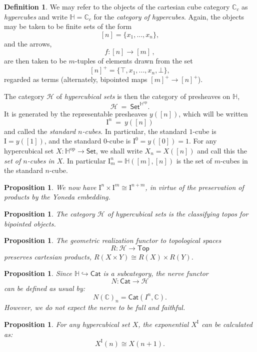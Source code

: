 \documentclass[11pt]{article}
\newcommand{\C}{\ensuremath{\mathbb{C}}}
\newcommand{\psh}[1]{\ensuremath{\mathsf{Set}^{#1^{\mathrm{op}}}}}
\newcommand{\Set}{\ensuremath{\mathsf{Set}}}
\newcommand{\Cat}{\ensuremath{\mathsf{Cat}}}
\newcommand{\hook}{\ensuremath{\hookrightarrow}}
\newcommand{\I}{\ensuremath{\mathrm{I}}}
\renewcommand{\H}{\ensuremath{\mathbb{H}}}
\newcommand{\HH}{\ensuremath{\mathcal{H}}}
\newtheorem{proposition}[theorem]{Proposition}
\theoremstyle{remark}
\theoremstyle{definition}
\newtheorem{definition}[theorem]{Definition}
\begin{document}
\begin{definition}
We may refer to the objects of the cartesian cube category $\C_c $ as \emph{hypercubes} and write $\H = \C_c$ for the \emph{category of hypercubes}.  Again, the objects may be taken to be finite sets of the form $$[n] = \{x_1, ..., x_n\},$$ and the arrows,
\[
f : [n] \to [m]\,,
\]
are then taken to be $m$-tuples of elements drawn from the set $$[n]^+ = \{\top, x_1, ..., x_n, \bot\},$$ regarded as terms (alternately, bipointed maps $[m]^+\to [n]^+$).

The category $\HH$ of \emph{hypercubical sets} is then the category of presheaves on $\H$,
\[
\HH\ =\ \psh{\H}.
\]
It is generated by the representable presheaves $y([n])$, which will be written
$$\I^n\ =\ y([n])$$ 
and called the \emph{standard $n$-cubes}.  In particular, the standard $1$-cube is $\I = y([1])$, and the standard $0$-cube is $\I^0 = y([0])=1$.  For any hypercubical set $X: \H^\mathrm{op} \to \Set$, we shall write $X_n = X([n])$ and call this the \emph{set of $n$-cubes in $X$}.  In particular $\I^n_m = \H([m],[n])$ is the set of $m$-cubes in the standard $n$-cube.
\end{definition}

\begin{proposition}
We now have $\I^n \times \I^m \cong \I^{n+m}$, in virtue of the preservation of products by the Yoneda embedding.
\end{proposition}


\begin{proposition}
The category $\HH$ of hypercubical sets is the classifying topos for bipointed objects.
\end{proposition}

\begin{proposition}
The geometric realization functor to topological spaces 
$$R: \HH \to \mathsf{Top}$$
preserves cartesian products, $R(X\times Y) \cong R(X)\times R(Y)$.
\end{proposition}

\begin{proposition}
Since $\H \hook  \Cat$ is a subcategory, the \emph{nerve} functor $$N : \Cat \to \HH$$ can be defined as usual by:
\[
N(\C)_n = \Cat(I^n, \C).
\]
However, we do not expect the nerve to be full and faithful.
\end{proposition}

\begin{proposition}
For any hypercubical set $X$, the exponential $X^\I$ can be calculated as:
\[
X^\I(n) \cong X(n+1).
\]
\end{proposition}
\end{document}
